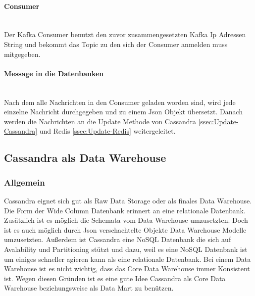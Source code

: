 \paragraph{Consumer}\mbox{} \\
Der Kafka Consumer benutzt den zuvor zusammengesetzten Kafka Ip Adressen String und bekommt das Topic zu den sich der Consumer anmelden muss mitgegeben. 
\paragraph{Message in die Datenbanken}\mbox{} \\
Nach dem alle Nachrichten in den Consumer geladen worden sind, wird jede einzelne Nachricht durchgegeben und zu einem Json Objekt übersetzt. Danach werden die Nachrichten an die Update Methode von Cassandra \ref{ssec:Update-Cassandra} und Redis \ref{ssec:Update-Redis} weitergeleitet.
\subsection{Cassandra als Data Warehouse}
\subsubsection{Allgemein}
Cassandra eignet sich gut als Raw Data Storage oder als finales Data Warehouse. Die Form der Wide Column Datenbank erinnert an eine relationale Datenbank. Zusätzlich ist es möglich die Schemata vom Data Warehouse umzusetzten. Doch ist es auch möglich durch Json verschachtelte Objekte Data Warehouse Modelle umzusetzten. Außerdem ist Cassandra eine NoSQL Datenbank die sich auf Avalability und Partitioning stützt und dazu, weil es eine NoSQL Datenbank ist um einiges schneller agieren kann als eine relationale Datenbank. Bei einem Data Warehouse ist es nicht wichtig, dass das Core Data Warehouse immer Konsistent ist. Wegen diesen Gründen ist es eine gute Idee Cassandra als Core Data Warehouse beziehungsweise als Data Mart zu benützen.
